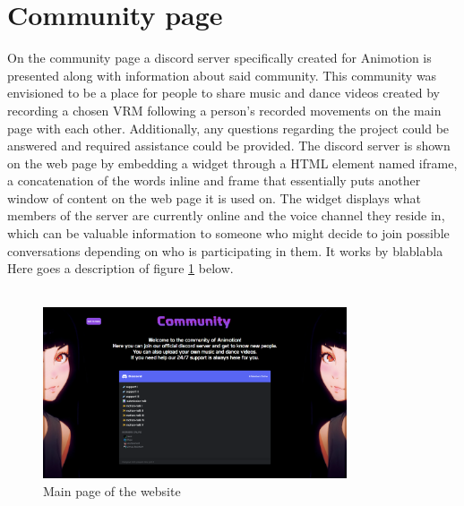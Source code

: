 \section{Community page}
On the community page a discord server specifically created for Animotion is presented along
with information about said community. This community was envisioned to be a place for people
to share music and dance videos created by recording a chosen VRM following a person's recorded
movements on the main page with each other. Additionally, any questions regarding the project
could be answered and required assistance could be provided. The discord server is shown on the
web page by embedding a widget through a HTML element named iframe, a concatenation of the words
inline and frame that essentially puts another window of content on the web page it is used on.
The widget displays what members of the server are currently online and the
voice channel they reside in, which can be valuable information to someone who might decide to
join possible conversations depending on who is participating in them. %
It works by blablabla
Here goes a description of figure \ref{fig:communitypage} below.
\\
\\
\begin{figure}[htb]
    \centering
    \includegraphics[width=0.8\textwidth]{pics/Animotion_community.png}
    \caption{Main page of the website}
    \label{fig:communitypage}
\end{figure}
\\
\\
